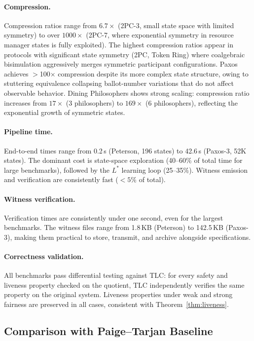 \documentclass[11pt]{article}
\begin{document}
\paragraph{Compression.}
Compression ratios range from $6.7\times$ (2PC-3, small state space with
limited symmetry) to over $1000\times$ (2PC-7, where exponential symmetry
in resource manager states is fully exploited).
The highest compression ratios appear in protocols with significant
state symmetry (2PC, Token Ring) where coalgebraic bisimulation aggressively
merges symmetric participant configurations.
Paxos achieves $>$100$\times$ compression despite its more complex state
structure, owing to stuttering equivalence collapsing ballot-number
variations that do not affect observable behavior.
Dining Philosophers shows strong scaling: compression ratio increases
from $17\times$ (3 philosophers) to $169\times$ (6 philosophers),
reflecting the exponential growth of symmetric states.

\paragraph{Pipeline time.}
End-to-end times range from 0.2\,s (Peterson, 196 states) to 42.6\,s
(Paxos-3, 52K states).
The dominant cost is state-space exploration (40--60\% of total time for
large benchmarks), followed by the $L^*$ learning loop (25--35\%).
Witness emission and verification are consistently fast ($< 5\%$ of total).

\paragraph{Witness verification.}
Verification times are consistently under one second, even for the largest
benchmarks.
The witness files range from 1.8\,KB (Peterson) to 142.5\,KB (Paxos-3),
making them practical to store, transmit, and archive alongside
specifications.

\paragraph{Correctness validation.}
All benchmarks pass differential testing against TLC: for every safety
and liveness property checked on the quotient, TLC independently verifies
the same property on the original system.
Liveness properties under weak and strong fairness are preserved in all
cases, consistent with Theorem~\ref{thm:liveness}.

\subsection{Comparison with Paige--Tarjan Baseline}
\end{document}

